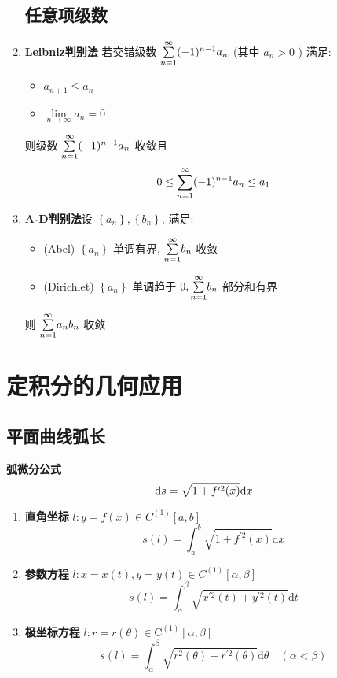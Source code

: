 \documentclass{article}
\begin{document}
\begin{enumerate}
			\subsection*{任意项级数}
				\item \textbf{Leibniz判别法}
				若\underline{交错级数} $\overunderset{\infty}{n=1}{\sum}(-1)^{n-1} a_{n}$ (其中 $a_{n}>0$ ) 满足:
				\begin{itemize}
					\item $a_{n+1} \leq a_{n}$
					\item $\underset{n \rightarrow \infty}{\lim} a_{n}=0$
				\end{itemize}
				则级数 $\overunderset{\infty}{n=1}{\sum}(-1)^{n-1} a_{n}$ 收敛且
				$$
				0 \leq \overunderset{\infty}{n=1}{\sum}(-1)^{n-1} a_{n} \leq a_{1}
				$$
				\item \textbf{A-D判别法}设 $\left\{a_{n}\right\}, \left\{b_{n}\right\}$, 满足:
				\begin{itemize}
					\item (Abel) $\left\{a_{n}\right\}$ 单调有界, $\overunderset{\infty}{n=1}{\sum} b_{n}$ 收敛
					\item (Dirichlet) $\left\{a_{n}\right\}$ 单调趋于 $0, \overunderset{\infty}{n=1}{\sum} b_{n}$ 部分和有界
				\end{itemize}
				则 $\overunderset{\infty}{n=1}{\sum} a_{n} b_{n}$ 收敛
			\end{enumerate}
	\section{定积分的几何应用}
		\subsection{平面曲线弧长}
		\textbf{弧微分公式}
		$$
		\mathrm{d} s =\sqrt{1+f^{\prime 2}(x)} \mathrm{d} x \\
		$$
		\begin{enumerate}
			\item \textbf{直角坐标} $l: y=f(x) \in C^{(1)}[a, b]$
			$$
			s(l)=\int_{a}^{b} \sqrt{1+f^{\prime 2}(x)} \mathrm{d} x
			$$
			\item \textbf{参数方程} $l: x=x(t), y=y(t) \in C^{(1)}[\alpha, \beta]$
			$$
			s(l)=\int_{\alpha}^{\beta} \sqrt{x^{\prime 2}(t)+y^{\prime 2}(t)} \mathrm{d} t
			$$
			\item \textbf{极坐标方程} $l: r=r(\theta) \in \mathrm{C}^{(1)}[\alpha, \beta]$
			$$
			s(l)=\int_{\alpha}^{\beta} \sqrt{r^{2}(\theta)+r^{\prime 2}(\theta)} \mathrm{d} \theta \quad(\alpha<\beta)
			$$
		\end{enumerate}
\end{document}
